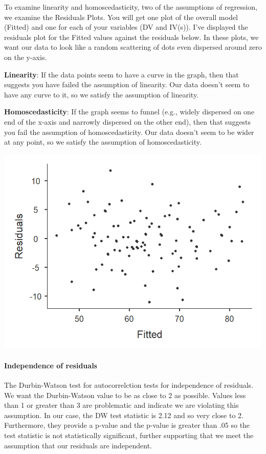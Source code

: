\documentclass[
]{book}
\begin{document}
To examine linearity and homoscedasticity, two of the assumptions of regression, we examine the Residuals Plots. You will get one plot of the overall model (Fitted) and one for each of your variables (DV and IV(s)). I've displayed the residuals plot for the Fitted values against the residuals below. In these plots, we want our data to look like a random scattering of dots even dispersed around zero on the y-axis.

\textbf{Linearity}: If the data points seem to have a curve in the graph, then that suggests you have failed the assumption of linearity. Our data doesn't seem to have any curve to it, so we satisfy the assumption of linearity.

\textbf{Homoscedasticity}: If the graph seems to funnel (e.g., widely dispersed on one end of the x-axis and narrowly dispersed on the other end), then that suggests you fail the assumption of homoscedasticity. Our data doesn't seem to be wider at any point, so we satisfy the assumption of homoscedasticity.

\includegraphics{images/13-regression/regression-residuals.png}

\hypertarget{independence-of-residuals}{%
\paragraph{Independence of residuals}\label{independence-of-residuals}}

The Durbin-Watson test for autocorrelction tests for independence of residuals. We want the Durbin-Watson value to be as close to 2 as possible. Values less than 1 or greater than 3 are problematic and indicate we are violating this assumption. In our case, the DW test statistic is 2.12 and so very close to 2. Furthermore, they provide a p-value and the p-value is greater than .05 so the test statistic is not statistically significant, further supporting that we meet the assumption that our residuals are independent.
\end{document}
